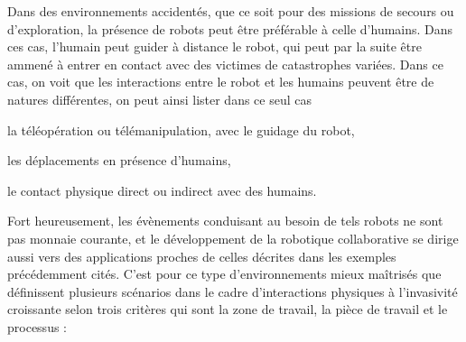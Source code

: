 Dans des environnements accidentés, que ce soit pour des missions de secours ou d'exploration, la présence de robots peut être préférable à celle d'humains. Dans ces cas, l'humain peut guider à distance le robot, qui peut par la suite être ammené à entrer en contact avec des victimes de catastrophes variées. Dans ce cas, on voit que les interactions entre le robot et les humains peuvent être de natures différentes, on peut ainsi lister dans ce seul cas 
\begin{enumerate*}[label=\roman*)]
	\item la téléopération ou télémanipulation, avec le guidage du robot,
	\item les déplacements en présence d'humains,
	\item le contact physique direct ou indirect avec des humains.
\end{enumerate*}

Fort heureusement, les évènements conduisant au besoin de tels robots ne sont pas monnaie courante, et le développement de la robotique collaborative se dirige aussi vers des applications proches de celles décrites dans les exemples précédemment cités. C'est pour ce type d'environnements mieux maîtrisés que \parencite{helms_robwork_2002} définissent plusieurs scénarios dans le cadre d'interactions physiques à l'invasivité croissante selon trois critères qui sont la zone de travail, la pièce de travail et le processus :

